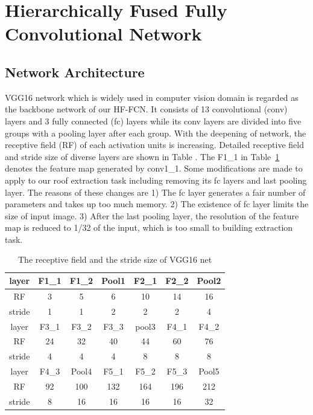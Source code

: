 \section{Hierarchically Fused Fully Convolutional Network}
\label{Sec:HF-FCN}


\subsection{Network Architecture}
 VGG16 network which is widely used in computer vision domain is regarded as the backbone network of our HF-FCN. 
 It consists of 13 convolutional (conv) layers and 3 fully connected (fc) layers while its conv layers are divided into five groups with a pooling layer after each group. With the deepening of network, the receptive field (RF) of each activation units is increasing. Detailed receptive field and stride size of diverse layers are shown in Table . The F1\_1 in Table~\ref{table:vgg16-layers} denotes the feature map generated by conv1\_1. 
 Some modifications are made to apply to our roof extraction task including removing its fc layers and last pooling layer. The reasons of these changes are 1) The fc layer generates a fair number of parameters and takes up too much memory. 2) The existence of fc layer limits the size of input image. 3) After the last pooling layer, the resolution of the feature map is reduced to 1/32 of the input, which is too small to building extraction task.
 
 
\begin{table}[!h!b!p]
\centering
\caption{The receptive field and the stride size of VGG16 net}
\label{table:vgg16-layers}
\begin{tabular}{c||cccccc}
\hline
layer &F1\_1 &F1\_2 & Pool1 &F2\_1 &F2\_2 &Pool2 \\ \hline
RF &3&5&6&10&14&16\\ \hline
stride &1 &1 &2 &2 &2 & 4\\ \hline\hline
layer &F3\_1 &F3\_2 & F3\_3 &pool3 &F4\_1&F4\_2\\ \hline
RF &24&32&40&44&60&76\\ \hline
stride &4 &4 &4 &8 &8 &8\\ \hline\hline
layer &F4\_3&Pool4 &F5\_1 &F5\_2 &F5\_3& Pool5 \\ \hline
RF &92 &100 &132 &164 &196 &212 \\ \hline
stride &8 &16 &16 &16 &16 &32\\ \hline
\end{tabular}
\end{table}

